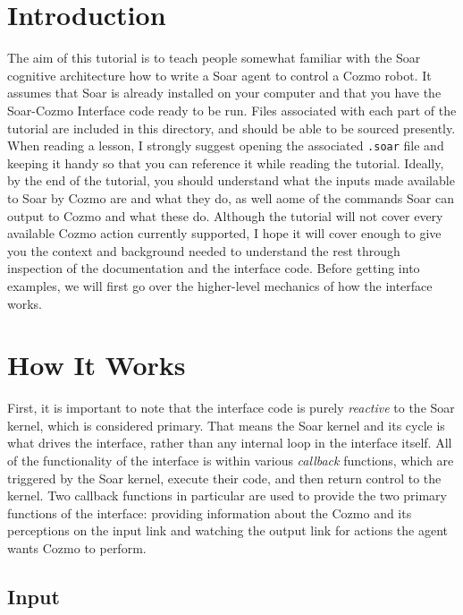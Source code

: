 \hypertarget{introduction}{%
\section{Introduction}\label{introduction}}

The aim of this tutorial is to teach people somewhat familiar with the
Soar cognitive architecture how to write a Soar agent to control a Cozmo
robot. It assumes that Soar is already installed on your computer and
that you have the Soar-Cozmo Interface code ready to be run. Files
associated with each part of the tutorial are included in this
directory, and should be able to be sourced presently. When reading a
lesson, I strongly suggest opening the associated \texttt{.soar} file
and keeping it handy so that you can reference it while reading the
tutorial. Ideally, by the end of the tutorial, you should understand
what the inputs made available to Soar by Cozmo are and what they do, as
well aome of the commands Soar can output to Cozmo and what these do.
Although the tutorial will not cover every available Cozmo action
currently supported, I hope it will cover enough to give you the context
and background needed to understand the rest through inspection of the
documentation and the interface code. Before getting into examples, we
will first go over the higher-level mechanics of how the interface
works.

\hypertarget{how-it-works}{%
\section{How It Works}\label{how-it-works}}

First, it is important to note that the interface code is purely
\emph{reactive} to the Soar kernel, which is considered primary. That
means the Soar kernel and its cycle is what drives the interface, rather
than any internal loop in the interface itself. All of the functionality
of the interface is within various \emph{callback} functions, which are
triggered by the Soar kernel, execute their code, and then return
control to the kernel. Two callback functions in particular are used to
provide the two primary functions of the interface: providing
information about the Cozmo and its perceptions on the input link and
watching the output link for actions the agent wants Cozmo to perform.

\hypertarget{input}{%
\subsection{Input}\label{input}}

